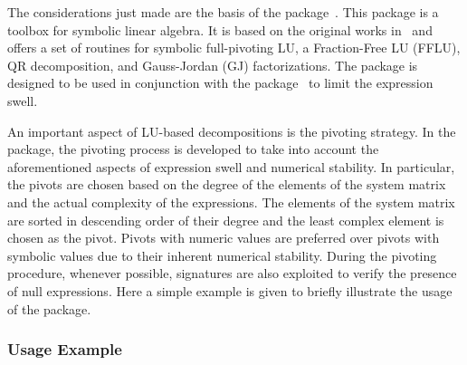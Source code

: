 The considerations just made are the basis of the \LAST{} package~\cite{last2023source}. This package is a \Maple{} toolbox for symbolic linear algebra. It is based on the original works in~\cite{carette2006linear,zhou2008fraction} and offers a set of routines for symbolic full-pivoting LU, a Fraction-Free LU (FFLU), QR decomposition, and Gauss-Jordan (GJ) factorizations. The package \LAST{} is designed to be used in conjunction with the \LEM{} package~\cite{lem2023source} to limit the expression swell.

An important aspect of LU-based decompositions is the pivoting strategy. In the \LAST{} package, the pivoting process is developed to take into account the aforementioned aspects of expression swell and numerical stability. In particular, the pivots are chosen based on the degree of the elements of the system matrix and the actual complexity of the expressions. The elements of the system matrix are sorted in descending order of their degree and the least complex element is chosen as the pivot. Pivots with numeric values are preferred over pivots with symbolic values due to their inherent numerical stability. During the pivoting procedure, whenever possible, signatures are also exploited to verify the presence of null expressions. Here a simple example is given to briefly illustrate the usage of the \LAST{} package.

\subsubsection{Usage Example}

